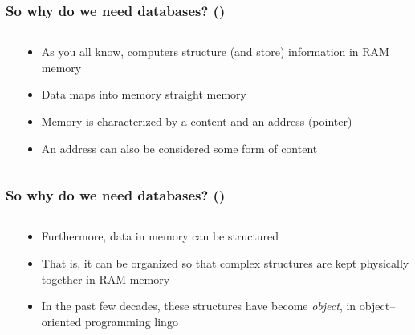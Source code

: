 \documentclass[\printmode,compress,xcolor=dvipsnames]{beamer}
\begin{document}
\setcounter{ms}{0}
\begin{frame}
  \frametitle<+->{So why do we need databases? ()}

  \begin{columns}[T]
    \begin{column}{\leftcolumn}
			\uncover<4->{}
    \end{column}
    \begin{column}{\rightcolumn}
      \begin{itemize}[<+- | alert@+->]

         \item As you all know, computers structure (and store) information in RAM memory

         \item Data maps into memory straight memory

         \item Memory is characterized by a content and an address (pointer)

         \item An address can also be considered some form of content

      \end{itemize}
    \end{column}
  \end{columns}
\end{frame}


\begin{frame}
  \frametitle<+->{So why do we need databases? ()}

  \begin{columns}[T]
    \begin{column}{\leftcolumn}
			\uncover<4->{}
    \end{column}
    \begin{column}{\rightcolumn}
      \begin{itemize}[<+- | alert@+->]

         \item Furthermore, data in memory can be structured

         \item That is, it can be organized so that complex structures
               are kept physically together in RAM memory

         \item In the past few decades, these structures have become
                 \emph{object}, in object--oriented programming lingo

      \end{itemize}
    \end{column}
  \end{columns}
\end{frame}
\end{document}
